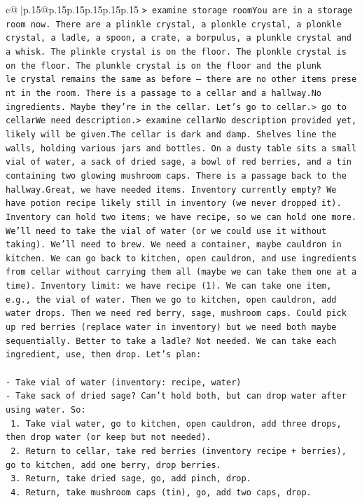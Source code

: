 \documentclass{article}
\begin{document}
{\begin{supertabular}{c@{$\;$}|p{.15\linewidth}@{}p{.15\linewidth}p{.15\linewidth}p{.15\linewidth}p{.15\linewidth}p{.15\linewidth}}
{{{\texttt{> examine storage roomYou are in a storage room now. There are a plinkle crystal, a plonkle crystal, a plonk​le crystal, a ladle, a spoon, a crate, a borpulus, a plunk​le crystal and a whisk. The plinkle crystal is on the floor. The plonkle crystal is on the floor. The plunk​le crystal~is~on~the floor~and~the~plunk​le~crystal~remains~the~same~as~before~—~there~are~no~other~items~present~in~the~room. There~is~a~passage~to~a~cellar~and~a~hallway.No ingredients. Maybe they're in the cellar. Let's go to cellar.> go to cellarWe need description.> examine cellarNo description provided yet, likely will be given.The cellar is dark and damp. Shelves line the walls, holding various jars and bottles. On a dusty table sits a small vial of water, a sack of dried sage, a bowl of red berries, and a tin containing two glowing mushroom caps. There is a passage back to the hallway.Great, we have needed items. Inventory currently empty? We have potion recipe likely still in inventory (we never dropped it). Inventory can hold two items; we have recipe, so we can hold one more. We'll need to take the vial of water (or we could use it without taking). We'll need to brew. We need a container, maybe cauldron in kitchen. We can go back to kitchen, open cauldron, and use ingredients from cellar without carrying them all (maybe we can take them one at a time). Inventory limit: we have recipe (1). We can take one item, e.g., the vial of water. Then we go to kitchen, open cauldron, add water drops. Then we need red berry, sage, mushroom caps. Could pick up red berries (replace water in inventory) but we need both maybe sequentially. Better to take a ladle? Not needed. We can take each ingredient, use, then drop. Let's plan:} \\
\\ 
\texttt{{-} Take vial of water (inventory: recipe, water)} \\
\texttt{{-} Take sack of dried sage? Can't hold both, but can drop water after using water. So:} \\
\texttt{   1. Take vial water, go to kitchen, open cauldron, add three drops, then drop water (or keep but not needed).} \\
\texttt{   2. Return to cellar, take red berries (inventory recipe + berries), go to kitchen, add one berry, drop berries.} \\
\texttt{   3. Return, take dried sage, go, add pinch, drop.} \\
\texttt{   4. Return, take mushroom caps (tin), go, add two caps, drop.} \\
}}}
\end{supertabular}}
\end{document}
